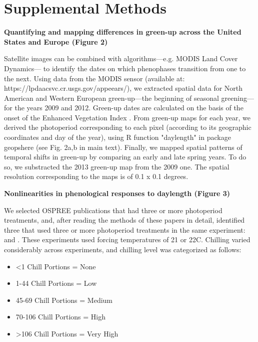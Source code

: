 \documentclass{article}
\begin{document}
\section*{Supplemental Methods}
\par \textbf{Quantifying and mapping differences in green-up across the United States and Europe (Figure 2)}
\par Satellite images can be combined with algorithms---e.g. MODIS Land Cover Dynamics--- to identify the dates on which phenophases transition from one to the next. Using data from the MODIS sensor (available at:  https://lpdaacsvc.cr.usgs.gov/appeears/), we extracted spatial data for North American and Western European green-up---the beginning of seasonal greening---for the years 2009 and 2012. Green-up dates are calculated on the basis of the onset of the Enhanced Vegetation Index \citep{huete2002}. From green-up maps for each year, we derived the photoperiod corresponding to each pixel (according to its geographic coordinates and day of the year), using R function "daylength" in package geopshere (see Fig. 2a,b in main text). Finally, we mapped spatial patterns of temporal shifts in green-up by comparing an early and late spring years. To do so, we substracted the 2013 green-up map from the 2009 one. The spatial resolution corresponding to the maps is of 0.1 x 0.1 degrees.
\par \textbf{Nonlinearities in phenological responses to daylength (Figure 3)}
\par We selected OSPREE publications that had three or more photoperiod treatments, and, after reading the methods of these papers in detail, identified three that used three or more photoperiod treatments in the same experiment: \citet{Ashby:1962aa,Heide:1993a} and \citet{Caffarra:2011b}. These experiments used forcing temperatures of 21 or 22\degree C. Chilling varied considerably across experiments, and chilling level was categorized as follows:
\begin{itemize}
\item <1 Chill Portions = None
\item 1-44 Chill Portions = Low
\item 45-69 Chill Portions = Medium 
\item 70-106 Chill Portions = High
\item >106 Chill Portions = Very High
\end{itemize}
\end{document}

